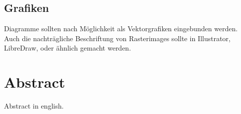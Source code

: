 \section*{Grafiken}
\noindent Diagramme sollten nach Möglichkeit als Vektorgrafiken eingebunden werden. Auch die nachträgliche Beschriftung von Rasterimages sollte in Illustrator, LibreDraw, oder ähnlich gemacht werden.
\let\oldcleardoublepage\cleardoublepage
\renewcommand\cleardoublepage{}

\chapter*{Abstract}
Abstract in english.

\let\cleardoublepage\oldcleardoublepage
\newpage
